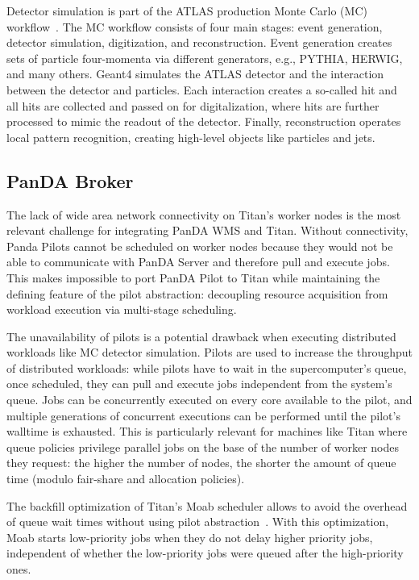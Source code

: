 Detector simulation is part of the ATLAS production Monte Carlo (MC)
workflow~\cite{rimoldi2006atlas}. %
The MC workflow consists of four main stages: event generation, detector
simulation, digitization, and reconstruction. Event generation creates sets
of particle four-momenta via different generators, e.g.,
PYTHIA, %
HERWIG, %
and many others. Geant4 simulates the ATLAS detector and the interaction
between the detector and particles. Each interaction creates a so-called hit
and all hits are collected and passed on for digitalization, where hits are
further processed to mimic the readout of the detector. Finally,
reconstruction operates local pattern recognition, creating high-level
objects like particles and jets.

\subsection{PanDA Broker}
\label{ssec:panda_titan}

The lack of wide area network connectivity on Titan's worker nodes is the
most relevant challenge for integrating PanDA WMS and Titan. Without
connectivity, Panda Pilots cannot be scheduled on worker nodes because they
would not be able to communicate with PanDA Server and therefore pull and
execute jobs. This makes impossible to port PanDA Pilot to Titan while
maintaining the defining feature of the pilot abstraction: decoupling
resource acquisition from workload execution via multi-stage scheduling.

The unavailability of pilots is a potential drawback when executing
distributed workloads like MC detector simulation. Pilots are used to
increase the throughput of distributed workloads: while pilots have to wait
in the supercomputer's queue, once scheduled, they can pull and execute jobs
independent from the system's queue. Jobs can be concurrently executed on
every core available to the pilot, and multiple generations of concurrent
executions can be performed until the pilot's walltime is exhausted. This is
particularly relevant for machines like Titan where queue policies privilege
parallel jobs on the base of the number of worker nodes they request: the
higher the number of nodes, the shorter the amount of queue time (modulo
fair-share and allocation policies).

The backfill optimization of Titan's Moab scheduler allows to avoid the
overhead of queue wait times without using pilot
abstraction~\cite{maui_backfill_url}. With this optimization, Moab starts
low-priority jobs when they do not delay higher priority jobs, independent of
whether the low-priority jobs were queued after the high-priority ones.

